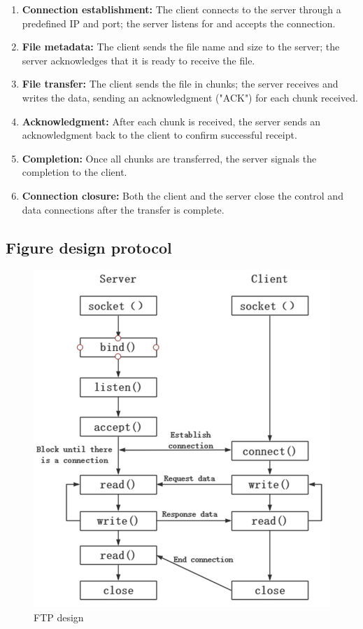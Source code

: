 \documentclass{article}
\begin{document}
\begin{enumerate}
    \item \textbf{Connection establishment:} The client connects to the server through a predefined IP and port; the server listens for and accepts the connection.
    \item \textbf{File metadata:} The client sends the file name and size to the server; the server acknowledges that it is ready to receive the file.
    \item \textbf{File transfer:} The client sends the file in chunks; the server receives and writes the data, sending an acknowledgment ("ACK") for each chunk received.
    \item \textbf{Acknowledgment:} After each chunk is received, the server sends an acknowledgment back to the client to confirm successful receipt.
    \item \textbf{Completion:} Once all chunks are transferred, the server signals the completion to the client.
    \item \textbf{Connection closure:} Both the client and the server close the control and data connections after the transfer is complete.
\end{enumerate}

\thispagestyle{empty}
    \newpage

\subsection{Figure design protocol}
\begin{figure}[ht!]
    \centering
    \includegraphics[width=1\textwidth]{Figure/Flow-chart-of-creating-a-socket-model.jpg}
    \caption{FTP design}
    \label{fig:ftp_des}
\end{figure}
\end{document}
